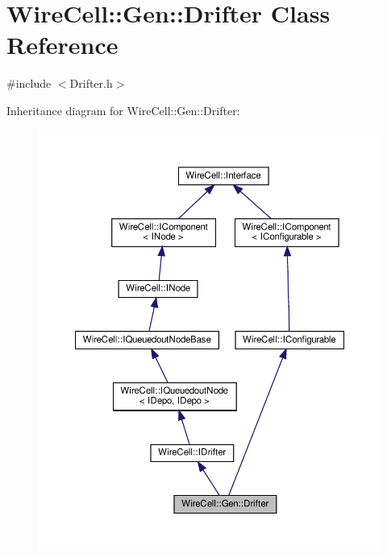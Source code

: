 \hypertarget{class_wire_cell_1_1_gen_1_1_drifter}{}\section{Wire\+Cell\+:\+:Gen\+:\+:Drifter Class Reference}
\label{class_wire_cell_1_1_gen_1_1_drifter}


{\ttfamily \#include $<$Drifter.\+h$>$}



Inheritance diagram for Wire\+Cell\+:\+:Gen\+:\+:Drifter\+:
\nopagebreak
\begin{figure}[H]
\begin{center}
\leavevmode
\includegraphics[width=350pt]{class_wire_cell_1_1_gen_1_1_drifter__inherit__graph}
\end{center}
\end{figure}


